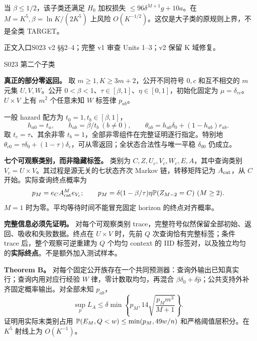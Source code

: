 \documentclass[11pt,a4paper]{article}
\newcommand{\head}[2]{{\small\sffamily #1}\par\vspace{2pt}{\LARGE\bfseries #2}\par\vspace{5pt}}
\newcommand{\entry}[1]{\vfill{\noindent\small\raggedright 正文入口\quad #1\par}}
\begin{document}
当 $\beta\le1/2$，该子类还满足 $H_0$ 加权损失 $\le96\delta^{M+1}g+10a$。在 $M=K^5,\beta=\ln K/(2K^5)$ 上风险 $O(K^{-1/2})$。这仅是大子类的原规则上界，不是全类 TARGET。
\entry{S023 v2 §§2--4；完整 v1 审查 Units 1--3；v2 保留 K 域修复。}
\newpage
\head{S023 第二个子类}{部分零返回族只得到受限预测器界}
\textbf{真正的部分零返回。} 取 $m\ge1,K\ge3m+2$，公开不同符号 $0,c$ 和互不相交的 $m$ 元集 $U,V,W$。公开 $0<\beta<1$、$\tau\in[\beta,1]$、$\eta\in[0,1]$，初始化固定为 $\mu=\delta_{cc}$。$U\times V$ 上有 $m^2$ 个任意未知 $W$ 标签律 $p_{ab}$。

一般 hazard 配方为 $t_0=1,t_b\in[\beta,1]$，
\[
 h_{a0}=t_a,\qquad h_{ab}=\beta/t_b\ (b\ne0),\qquad
 \theta_{ab}=h_{ab}\delta_0+(1-h_{ab})r_{ab}.
\]
取 $t_c=\tau$、其余非零 $t_b=1$，全部非零组件在完整证明逐行指定。特别地 $\theta_{c0}=\tau\delta_0+(1-\tau)\delta_c$，可从零返回；全状态合法性与唯一平稳 $\delta_{00}$ 仍成立。

\textbf{七个可观察类别，而非隐藏标签。} 类别为 $C,Z,U_c,V_c,W_c,E,A$，其中查询类别 $V_c=U\times V$。其过程是源无关的七状态齐次 Markov 链，转移矩阵记为 $A_{\rm cat}$，从 $C$ 开始。实际查询终点概率为
\[
 p_M=e_C A_{\rm cat}^{M}e_{V_c};\qquad
 p_M=\delta(1-\beta/\tau)\eta\mathbb P(Z_{M-2}=C)\ (M\ge2).
\]
$M=1$ 时为零。平均等待时间不能冒充固定 horizon 的终点对齐概率。

\textbf{完整信息必须先证明。} 对每个可观察类别 trace，完整符号似然保留全部初始、返回、吸收和失败数据。终点在 $U\times V$ 时，先前 $Q$ 次查询恰有完整标签；条件 trace 后，整个观察可逆重建为 $Q$ 个均匀 context 的 IID 标签对，以及独立均匀的\textbf{实际终点}。不是额外加入测试样本。

\textbf{Theorem B。} 对每个固定公开族存在一个共同预测器：查询外输出已知真实行；查询内用对应行经验 $W$ 律，零计数取均匀，再混合 $\beta\delta_0+\delta\widehat p$；公共支持外补齐固定概率输出。对全部未知 $p_{ab}$，
\[
 \sup_p L_A\le\delta\min\left\{p_M,14\sqrt{\frac{p_Mm^3}{M+1}}\right\}.
\]
证明用实际末类别占用 $\mathbb P(E_M,Q<w)\le\min(p_M,49w/n)$ 和严格阈值层积分。在 $K^5$ 射线上为 $O(K^{-1})$。
\end{document}
